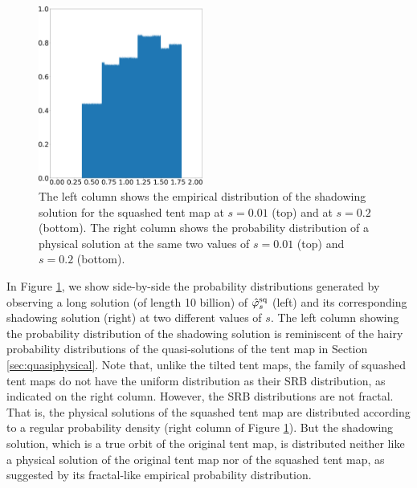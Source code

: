 \begin{figure}[H]
    \includegraphics[width=0.48\textwidth]{figure/tent_squashed_physical_density_0.2.png}
    \caption{The left column shows the empirical distribution of the shadowing solution for the squashed tent map at $s=0.01$ (top) and at $s=0.2$ (bottom). The right column shows the probability distribution of a physical solution at the same two values of $s = 0.01$ (top) and $s = 0.2$ (bottom).}
    \label{fig:tent_squashed_shadow}
\end{figure}
In Figure \ref{fig:tent_squashed_shadow}, we show side-by-side the probability distributions generated by observing a long solution (of length 10 billion) 
of $\hat{\varphi}^{\rm sq}_s$ (left) and its corresponding shadowing solution (right)
at two different values of $s.$ The left column showing the probability distribution of the shadowing solution is reminiscent of the hairy probability distributions of 
the quasi-solutions of the tent map in Section \ref{sec:quasiphysical}. Note that, unlike the tilted tent maps, the family of squashed tent maps do not have the uniform distribution as their SRB distribution, as indicated on the right column. However, the SRB distributions are not fractal. That is, the physical solutions of the squashed tent map are distributed according to a regular probability density (right column of Figure \ref{fig:tent_squashed_shadow}). But the shadowing solution, which is a true orbit of the original tent map, is distributed neither like a physical solution of the original tent map nor of the squashed tent map, as suggested by its fractal-like empirical probability distribution. 

